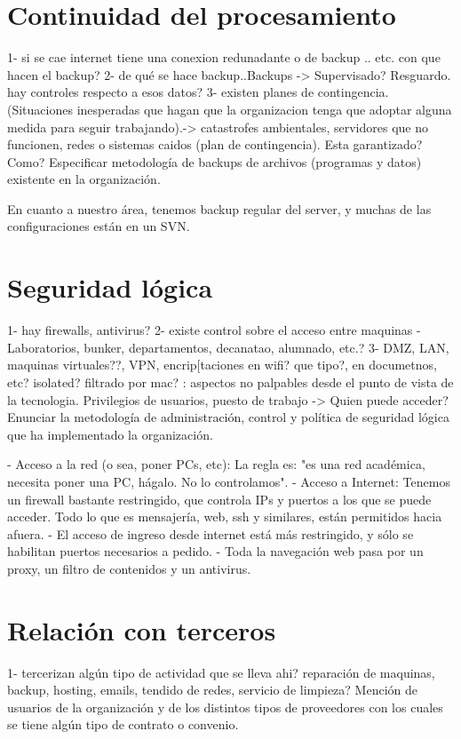 \documentclass[10pt,a4paper,final]{article}
\begin{document}
\section{Continuidad del procesamiento}
1- si se cae internet tiene una conexion redunadante o de backup .. etc. con que hacen el backup?
2- de qué se hace backup..Backups -> Supervisado? Resguardo. hay controles respecto a esos datos?
3- existen planes de contingencia.
 (Situaciones inesperadas que hagan que la organizacion tenga que adoptar alguna medida para seguir trabajando).-> catastrofes ambientales, servidores que no funcionen, redes o sistemas caidos (plan de contingencia). Esta garantizado? Como?
 Especificar metodología de backups de archivos (programas y datos) existente en la organización.

En cuanto a nuestro área, tenemos backup regular del server, y muchas de las configuraciones están en un SVN. 
\section{Seguridad lógica}
1- hay firewalls, antivirus?
2- existe control sobre el acceso entre maquinas - Laboratorios, bunker, departamentos, decanatao, alumnado, etc.?
3- DMZ, LAN, maquinas virtuales??, VPN, encrip[taciones en wifi? que tipo?, en documetnos, etc? isolated? filtrado por mac?
: aspectos no palpables desde el punto de vista de la tecnologia. Privilegios de usuarios, puesto de trabajo -> Quien puede acceder? 
Enunciar la metodología de administración, control y política de seguridad lógica que ha implementado la organización.


- Acceso a la red (o sea, poner PCs, etc): La regla es: "es una red académica, necesita poner una PC, hágalo. No lo controlamos".
- Acceso a Internet: Tenemos un firewall bastante restringido, que controla IPs y puertos a los que se puede acceder. Todo lo que es mensajería, web, ssh y similares, están permitidos hacia afuera.
  - El acceso de ingreso desde internet está más restringido, y sólo se habilitan puertos necesarios a pedido.
- Toda la navegación web pasa por un proxy, un filtro de contenidos y un antivirus.
\section{Relación con terceros}
1- tercerizan algún tipo de actividad que se lleva ahi? reparación de maquinas, backup, hosting, emails, tendido de redes, servicio de limpieza?
Mención de usuarios de la organización y de los distintos tipos de proveedores con los cuales se tiene algún tipo de contrato o convenio.
\end{document}
